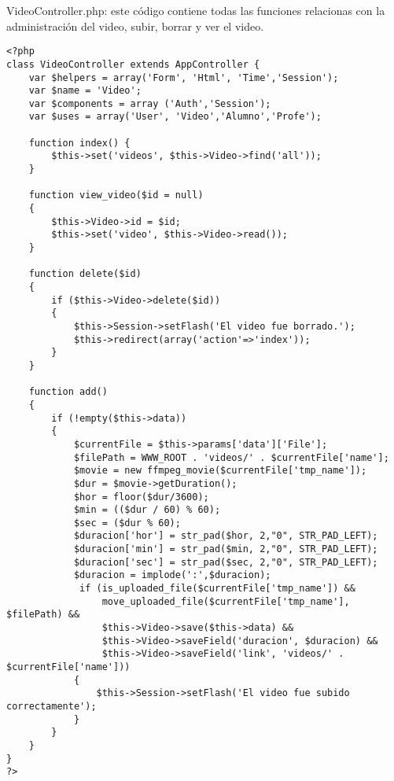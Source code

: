 \documentclass[12pt]{article}
\begin{document}
VideoController.php: este código contiene todas las funciones relacionas con la administración del video, 
subir, borrar y ver el video.\\
\footnotesize
\begin{verbatim}
<?php
class VideoController extends AppController {
	var $helpers = array('Form', 'Html', 'Time','Session');
	var $name = 'Video';
	var $components = array ('Auth','Session');
	var $uses = array('User', 'Video','Alumno','Profe');

	function index() {
		$this->set('videos', $this->Video->find('all'));
	}

	function view_video($id = null) 
	{
		$this->Video->id = $id;
		$this->set('video', $this->Video->read());	
	}
																				
	function delete($id) 
	{
		if ($this->Video->delete($id))
		{
			$this->Session->setFlash('El video fue borrado.');
			$this->redirect(array('action'=>'index'));
		}
	}

	function add() 
	{
		if (!empty($this->data))
		{
			$currentFile = $this->params['data']['File'];
			$filePath = WWW_ROOT . 'videos/' . $currentFile['name']; 
			$movie = new ffmpeg_movie($currentFile['tmp_name']);
			$dur = $movie->getDuration();
			$hor = floor($dur/3600);
			$min = (($dur / 60) % 60);
			$sec = ($dur % 60);
			$duracion['hor'] = str_pad($hor, 2,"0", STR_PAD_LEFT);
			$duracion['min'] = str_pad($min, 2,"0", STR_PAD_LEFT);
			$duracion['sec'] = str_pad($sec, 2,"0", STR_PAD_LEFT);
			$duracion = implode(':',$duracion);
			 if (is_uploaded_file($currentFile['tmp_name']) && 
				 move_uploaded_file($currentFile['tmp_name'], $filePath) &&
 				 $this->Video->save($this->data) && 
				 $this->Video->saveField('duracion', $duracion) &&
 				 $this->Video->saveField('link', 'videos/' . $currentFile['name']))
 			{ 	
				$this->Session->setFlash('El video fue subido correctamente');
			} 
		}
	}
}
?>
\end{verbatim}
\end{document}
